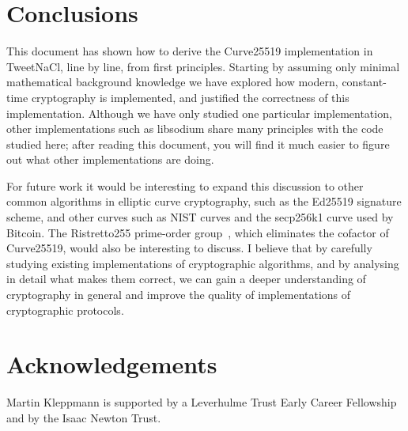 \documentclass{article}
\begin{document}
\section{Conclusions}

This document has shown how to derive the Curve25519 implementation in TweetNaCl, line by line, from first principles.
Starting by assuming only minimal mathematical background knowledge we have explored how modern, constant-time cryptography is implemented, and justified the correctness of this implementation.
Although we have only studied one particular implementation, other implementations such as libsodium share many principles with the code studied here; after reading this document, you will find it much easier to figure out what other implementations are doing.

For future work it would be interesting to expand this discussion to other common algorithms in elliptic curve cryptography, such as the Ed25519 signature scheme, and other curves such as NIST curves and the secp256k1 curve used by Bitcoin.
The Ristretto255 prime-order group~\cite{Ristretto255}, which eliminates the cofactor of Curve25519, would also be interesting to discuss.
I believe that by carefully studying existing implementations of cryptographic algorithms, and by analysing in detail what makes them correct, we can gain a deeper understanding of cryptography in general and improve the quality of implementations of cryptographic protocols.








\section*{Acknowledgements}

Martin Kleppmann is supported by a Leverhulme Trust Early Career Fellowship and by the Isaac Newton Trust.



\end{document}
